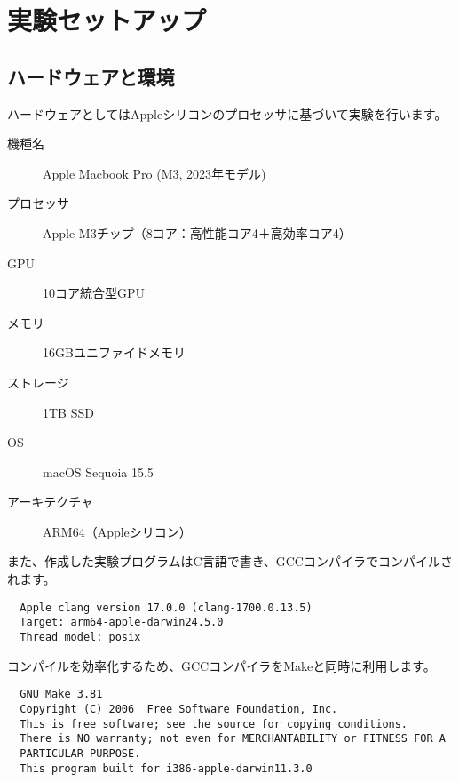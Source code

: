 \documentclass[a4j, 12pt]{jarticle}
\begin{document}
\section{実験セットアップ}
\subsection{ハードウェアと環境}
ハードウェアとしてはAppleシリコンのプロセッサに基づいて実験を行います。
\begin{description}
  \item[機種名] Apple Macbook Pro (M3, 2023年モデル)
  \item[プロセッサ] Apple M3チップ（8コア：高性能コア4＋高効率コア4）
  \item[GPU] 10コア統合型GPU
  \item[メモリ] 16GBユニファイドメモリ
  \item[ストレージ] 1TB SSD
  \item[OS] macOS Sequoia 15.5
  \item[アーキテクチャ] ARM64（Appleシリコン） 
\end{description}
また、作成した実験プログラムはC言語で書き、GCCコンパイラでコンパイルされます。
\begin{verbatim}
  Apple clang version 17.0.0 (clang-1700.0.13.5)
  Target: arm64-apple-darwin24.5.0
  Thread model: posix
\end{verbatim}
コンパイルを効率化するため、GCCコンパイラをMakeと同時に利用します。
\begin{verbatim}
  GNU Make 3.81
  Copyright (C) 2006  Free Software Foundation, Inc.
  This is free software; see the source for copying conditions.
  There is NO warranty; not even for MERCHANTABILITY or FITNESS FOR A
  PARTICULAR PURPOSE.
  This program built for i386-apple-darwin11.3.0
\end{verbatim}
\end{document}
